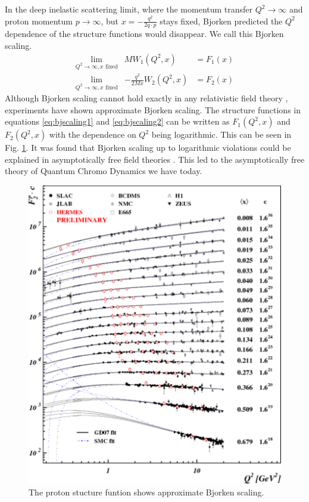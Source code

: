 \documentclass[letterpaper, abstract = on,listof=totoc, bibliography=totoc]{scrreprt}
\begin{document}
In the deep inelastic scattering limit, where the momentum transfer $Q^2\rightarrow\infty$ and proton momentum $p\rightarrow\infty$, but $x = -\frac{q^2}{2q\cdot p}$ stays fixed, Bjorken predicted the $Q^2$ dependence of the structure functions would disappear. We call this Bjorken scaling.
\begin{eqnarray}
\lim\limits_{Q^2\rightarrow\infty, x \text{ fixed}}& MW_1(Q^2,x) &= F_1(x) \label{eq:bjscaling1}\\
\lim\limits_{Q^2\rightarrow\infty, x \text{ fixed}}& -\frac{q^2}{2Mx}W_2(Q^2,x) &= F_2(x) \label{eq:bjscaling2}
\end{eqnarray}
Although Bjorken scaling cannot hold exactly in any relativistic field theory \cite{AlderTungPhysRevLett.22.978}, experiments have shown approximate Bjorken scaling. The structure functions in equations \ref{eq:bjscaling1} and \ref{eq:bjscaling2} can be written as $F_1(Q^2,x)$ and $F_2(Q^2,x)$ with the dependence on $Q^2$ being logarithmic. This can be seen in Fig. \ref{fig:F2Scaling}. It was found that Bjorken scaling up to logarithmic violations could be explained in asymptotically free field theories \cite{Gross:1992cw}. This led to the asymptotically free theory of Quantum Chromo Dynamics we have today. 
\begin{figure}
\begin{center}
\includegraphics[width = .6\textwidth]{StructFunc2}
\caption[Scaling of the proton structure function $F_2$]{The proton stucture funtion shows approximate Bjorken scaling.}
\label{fig:F2Scaling}
\end{center}
\end{figure}
\end{document}
